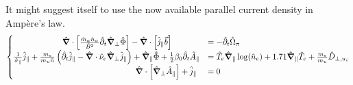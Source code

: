 

It might suggest itself to use the now available parallel current density in Ampère's law. 
\begin{equation}
	\label{eq:vorticityEquation_ElectronInertiaElectromagnetism_dedimensionalized_matrix}
	\begin{cases}
		\qquad\qquad\qquad\hat{\grad}\cdot\left[\frac{\hat{m}_\alpha \hat{n}_\alpha}{ \hat{B}^2}\hat{\partial}_t\hat{\grad}_\perp\hat{\Phi}\right] - \hat{\grad}\cdot\left[\hat{j}_\parallel \vec{b}\right]
		&= -\hat{\partial}_t \hat{\Omega}_\pi \\
		\frac{1}{\hat{\sigma}_\parallel}\hat{j}_\parallel + \frac{m_e}{m_u\hat{n}} \left(\hat{\partial}_t\hat{j}_\parallel - \hat{\grad}\cdot\hat{\nu}_e\hat{\grad}_\perp\hat{j}_\parallel\right)+ \hat{\grad}_\parallel\hat{\Phi} + \frac{1}{2}\beta_0\hat{\partial}_t\hat{A}_\parallel &= \hat{T}_e\hat{\grad}_\parallel\log(\hat{n}_e) + 1.71\hat{\grad}_\parallel \hat{T}_e + \frac{m_e}{m_u}\hat{D}_{\perp,u_i} \\
		\qquad\qquad\qquad\qquad\qquad\qquad\qquad\quad\hat{\grad}\cdot\left[\hat{\grad}_\perp \hat{A}_\parallel\right] + \hat{j}_\parallel
		&= 0
	\end{cases}
\end{equation}

